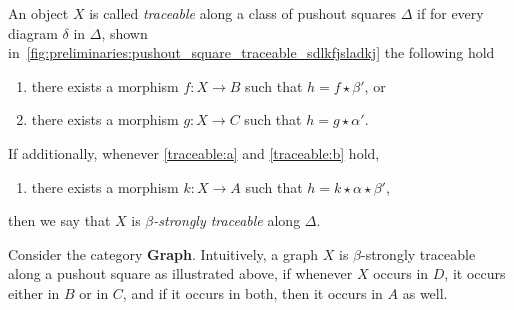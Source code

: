 \begin{definition}
    \label{def:traceability}
An object $X$ is called \emph{traceable} along a class of pushout squares $\Delta$ if for every diagram $\delta$ in $\Delta$, shown in~\autoref{fig:preliminaries:pushout_square_traceable_sdlkfjsladkj}        
 the following hold
    \begin{enumerate}[label=(\alph*)]
        \item\label{traceable:a} there exists a morphism $f : X \to B$ such that $h = f \star \beta'$, or
        \item\label{traceable:b} there exists a morphism $g : X \to C$ such that $h = g \star \alpha'$.
    \end{enumerate}
    \begin{figure}[H]
    \centering
    \caption{}
    \label{fig:preliminaries:pushout_square_traceable_sdlkfjsladkj}
\end{figure}
    If additionally, 
    whenever \ref{traceable:a} and \ref {traceable:b} hold,
    \begin{enumerate}[label=(\alph*),resume]
        \item 
        there exists a morphism $k : X \to A$ such that $h = k \star \alpha \star \beta' $,
    \end{enumerate}
    then we say that $X$ is \emph{$\beta$-strongly traceable} along $\Delta$.
\end{definition}
Consider the category \textbf{Graph}. Intuitively, a graph $X$ is $\beta$-strongly traceable along a pushout square as illustrated above, if whenever $X$ occurs in $D$, it occurs either in $B$ or in $C$, and if it occurs in both, then it occurs in $A$ as well.

